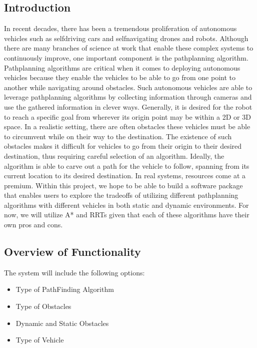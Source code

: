 \documentclass[letterpaper,10pt,english]{sphinxmanual}
\begin{document}
\subsection{Introduction}
\label{\detokenize{background_science:introduction}}
\sphinxAtStartPar
In recent decades, there has been a tremendous proliferation of autonomous vehicles such as self\sphinxhyphen{}driving cars and self\sphinxhyphen{}navigating drones and robots. Although there are many branches of science at work that enable these complex systems to continuously improve, one important component is the path\sphinxhyphen{}planning algorithm. Path\sphinxhyphen{}planning algorithms are critical when it comes to deploying autonomous vehicles because they enable the vehicles to be able to go from one point to another while navigating around obstacles. Such autonomous vehicles are able to leverage path\sphinxhyphen{}planning algorithms by collecting information through cameras and use the gathered information in clever ways.
Generally, it is desired for the robot to reach a specific goal from wherever its origin point may be within a 2D or 3D space. In a realistic setting, there are often obstacles these vehicles must be able to circumvent while on their way to the destination. The existence of such obstacles makes it difficult for vehicles to go from their origin to their desired destination, thus requiring careful selection of an algorithm. Ideally, the algorithm is able to carve out a path for the vehicle to follow, spanning from its current location to its desired destination.
In real systems, resources come at a premium. Within this project, we hope to be able to build a software package that enables users to explore the trade\sphinxhyphen{}offs of utilizing different path\sphinxhyphen{}planning algorithms with different vehicles in both static and dynamic environments. For now, we will utilize A* and RRTs given that each of these algorithms have their own pros and cons.


\subsection{Overview of Functionality}
\label{\detokenize{background_science:overview-of-functionality}}
\sphinxAtStartPar
The system will include the following options:
\begin{itemize}
\item {} 
\sphinxAtStartPar
Type of Path\sphinxhyphen{}Finding Algorithm

\item {} 
\sphinxAtStartPar
Type of Obstacles

\item {} 
\sphinxAtStartPar
Dynamic and Static Obstacles

\item {} 
\sphinxAtStartPar
Type of Vehicle

\end{itemize}
\end{document}
